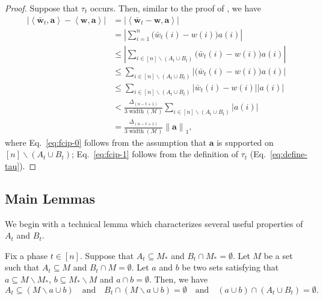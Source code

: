 \documentclass{article}
\newcommand{\M}{\mathcal M}
\newcommand{\del}{\backslash}
\DeclareMathOperator{\rank}{width}
\newcommand{\inn}[1]{\left\langle #1 \right\rangle}
\newcommand{\nor}[1]{\left\|#1\right\|}
\renewcommand{\vec}[1]{\boldsymbol{#1}}
\begin{document}
\begin{proof}
Suppose that $\tau_t$ occurs. 
Then, similar to the proof of , we have
\begin{align}
\left| \inn{\vec{\bar w}_t, \vec a} - \inn{\vec w, \vec a} \right|
&= \left| \inn{\vec{\bar w}_t-\vec w, \vec a} \right|  \nonumber \\
&= \left|\sum_{i=1}^n \big(\bar w_t(i)-w(i)\big) a(i) \right| \nonumber \\
&\le \left|\sum_{i\in[n]\del (A_t\cup B_t)} \big(\bar w_t(i)-w(i)\big) a(i) \right| \label{eq:fcip-0} \\
&\le \sum_{i\in[n]\del (A_t\cup B_t)} \left| \big(\bar w_t(i)-w(i)\big) a(i)\right| \nonumber\\
&\le \sum_{i\in[n]\del (A_t\cup B_t)} \left|\bar w_t(i)-w(i)\right| |a(i)| \nonumber\\
&< \frac{\Delta_{(n-t+1)}}{3\rank(\M)} \sum_{i\in[n]\del (A_t\cup B_t)} |a(i)| \label{eq:fcip-1}\\
&= \frac{\Delta_{(n-t+1)}}{3\rank(\M)} \nor{\vec a}_1, \nonumber
\end{align}
where Eq.~\eqref{eq:fcip-0} follows from the assumption that $\vec a$ is supported on $[n] \del (A_t\cup B_t)$;
Eq.~\eqref{eq:fcip-1} follows from the definition of $\tau_t$ (Eq.~\eqref{eq:define-tau}).
\end{proof}

\subsection{Main Lemmas}

We begin with a technical lemma which characterizes several useful properties of $A_t$ and $B_t$.

\begin{lemma}
Fix a phase $t\in[n]$. Suppose that $A_t\subseteq M_*$ and $B_t \cap M_* = \emptyset$.
Let $M$ be a set such that $A_t \subseteq M$ and $B_t \cap M = \emptyset$.
Let $a$ and $b$ be two sets satisfying that $a \subseteq M\del M_*$, $b \subseteq M_* \del M$ and $a\cap b = \emptyset$.
Then, we have
$$
A_t \subseteq (M \del a \cup b) \quad\text{and}\quad B_t \cap (M \del a \cup b) = \emptyset
\quad\text{and}\quad (a\cup b)\cap (A_t\cup B_t) = \emptyset.
$$
\label{lemma:set-tech}
\end{lemma}
\end{document}
